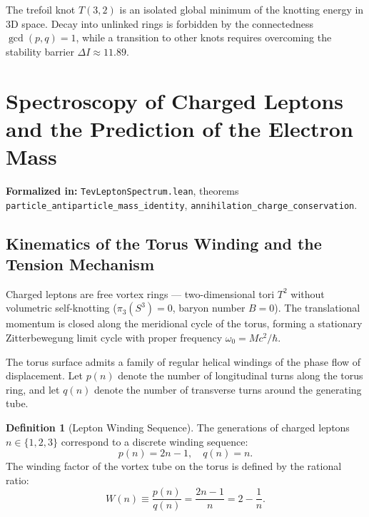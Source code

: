 \documentclass[11pt,a4paper]{article}
\theoremstyle{definition}
\newtheorem{definition}{Definition}
\theoremstyle{remark}
\begin{document}
The trefoil knot $T(3,2)$ is an isolated global minimum of the knotting energy in 3D space. Decay into unlinked rings is forbidden by the connectedness $\gcd(p,q)=1$, while a transition to other knots requires overcoming the stability barrier $\Delta I \approx 11.89$.
	
\section{Spectroscopy of Charged Leptons and the Prediction of the Electron Mass}
\noindent\small\textbf{Formalized in:} \texttt{TevLeptonSpectrum.lean}, theorems \texttt{particle\_antiparticle\_mass\_identity}, \texttt{annihilation\_charge\_conservation}.
	
\subsection{Kinematics of the Torus Winding and the Tension Mechanism}
	
Charged leptons are free vortex rings — two-dimensional tori $T^2$ without volumetric self-knotting ($\pi_3(S^3) = 0$, baryon number $B = 0$). The translational momentum is closed along the meridional cycle of the torus, forming a stationary Zitterbewegung limit cycle with proper frequency $\omega_0 = M c^2 / \hbar$.

The torus surface admits a family of regular helical windings of the phase flow of displacement. Let $p(n)$ denote the number of longitudinal turns along the torus ring, and let $q(n)$ denote the number of transverse turns around the generating tube.
	
\begin{definition}[Lepton Winding Sequence]
The generations of charged leptons $n \in \{1, 2, 3\}$ correspond to a discrete winding sequence:
\begin{equation}
	p(n) = 2n - 1, \quad q(n) = n.
	\label{eq:lepton_winding_components}
\end{equation}
The winding factor of the vortex tube on the torus is defined by the rational ratio:
\begin{equation}
	W(n) \equiv \frac{p(n)}{q(n)} = \frac{2n - 1}{n} = 2 - \frac{1}{n}.
	\label{eq:spring_winding}
\end{equation}
\end{definition}
	
\end{document}
